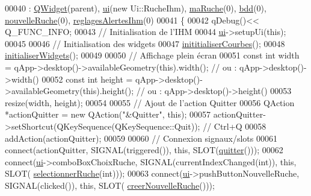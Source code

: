 \begin{DoxyCode}
00040                                   : \hyperlink{class_q_widget}{QWidget}(parent), \hyperlink{class_ruche_ihm_a64786058bd7f88ca2f1e9743bb27c25b}{ui}(\textcolor{keyword}{new} Ui::RucheIhm), 
      \hyperlink{class_ruche_ihm_a43a6b1fa31f4fba58d919daae3707b38}{maRuche}(0), \hyperlink{class_ruche_ihm_a0851936fe212e8d40538264f09749153}{bdd}(0), \hyperlink{class_ruche_ihm_a3a27b7af842244c6db3623f5f256bed5}{nouvelleRuche}(0), \hyperlink{class_ruche_ihm_a04068fbec978c2443f3baf08d4945929}{reglagesAlertesIhm}(0)
00041 \{
00042     qDebug()<< Q\_FUNC\_INFO;
00043     \textcolor{comment}{// Initialisation de l'IHM}
00044     \hyperlink{class_ruche_ihm_a64786058bd7f88ca2f1e9743bb27c25b}{ui}->setupUi(\textcolor{keyword}{this});
00045 
00046     \textcolor{comment}{// Initialisation des widgets}
00047     \hyperlink{class_ruche_ihm_a4fe15b22538611ad9ffc4d807f8b78fd}{inititialiserCourbes}();
00048     \hyperlink{class_ruche_ihm_a98c493fcd2ef145a3d51ff84bbf8748e}{initialiserWidgets}();
00049 
00050     \textcolor{comment}{// Affichage plein écran}
00051     \textcolor{keyword}{const} \textcolor{keywordtype}{int} width = qApp->desktop()->availableGeometry(\textcolor{keyword}{this}).width(); \textcolor{comment}{// ou : qApp->desktop()->width()}
00052     \textcolor{keyword}{const} \textcolor{keywordtype}{int} height = qApp->desktop()->availableGeometry(\textcolor{keyword}{this}).height(); \textcolor{comment}{// ou : qApp->desktop()->height()}
00053     resize(width, height);
00054 
00055     \textcolor{comment}{// Ajout de l'action Quitter}
00056     QAction *actionQuitter = \textcolor{keyword}{new} QAction(\textcolor{stringliteral}{"&Quitter"}, \textcolor{keyword}{this});
00057     actionQuitter->setShortcut(QKeySequence(QKeySequence::Quit)); \textcolor{comment}{// Ctrl+Q}
00058     addAction(actionQuitter);
00059 
00060     \textcolor{comment}{// Connexion signaux/slots}
00061     connect(actionQuitter, SIGNAL(triggered()), \textcolor{keyword}{this}, SLOT(\hyperlink{class_ruche_ihm_a382502aff2ab21abf60f05bf573477fd}{quitter}()));
00062     connect(\hyperlink{class_ruche_ihm_a64786058bd7f88ca2f1e9743bb27c25b}{ui}->comboBoxChoixRuche, SIGNAL(currentIndexChanged(\textcolor{keywordtype}{int})), \textcolor{keyword}{this}, SLOT(
      \hyperlink{class_ruche_ihm_a7324ae6ea574ccdad47783f466933157}{selectionnerRuche}(\textcolor{keywordtype}{int})));
00063     connect(\hyperlink{class_ruche_ihm_a64786058bd7f88ca2f1e9743bb27c25b}{ui}->pushButtonNouvelleRuche, SIGNAL(clicked()), \textcolor{keyword}{this}, SLOT(
      \hyperlink{class_ruche_ihm_a2a106515c13c06c51799432a1c2baa3b}{creerNouvelleRuche}()));

\end{DoxyCode}
